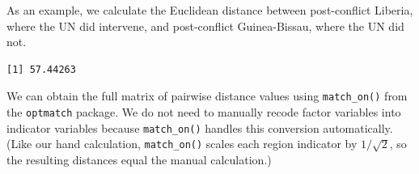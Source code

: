 \documentclass[
  12pt,
  leqno]{article}
\newenvironment{Shaded}{\begin{snugshade}}{\end{snugshade}}
\newcommand{\CommentTok}[1]{\textcolor[rgb]{0.56,0.35,0.01}{\textit{#1}}}
\newcommand{\DecValTok}[1]{\textcolor[rgb]{0.00,0.00,0.81}{#1}}
\newcommand{\FunctionTok}[1]{\textcolor[rgb]{0.13,0.29,0.53}{\textbf{#1}}}
\newcommand{\NormalTok}[1]{#1}
\newcommand{\OtherTok}[1]{\textcolor[rgb]{0.56,0.35,0.01}{#1}}
\newcommand{\SpecialCharTok}[1]{\textcolor[rgb]{0.81,0.36,0.00}{\textbf{#1}}}
\newcommand{\StringTok}[1]{\textcolor[rgb]{0.31,0.60,0.02}{#1}}
\begin{document}
\doublespacing

As an example, we calculate the Euclidean distance between post-conflict
Liberia, where the UN did intervene, and post-conflict Guinea-Bissau,
where the UN did not.

\singlespacing

\begin{Shaded}
\end{Shaded}

\begin{verbatim}
[1] 57.44263
\end{verbatim}

\doublespacing

We can obtain the full matrix of pairwise distance values using
\texttt{match\_on()} from the \texttt{optmatch} package. We do not need
to manually recode factor variables into indicator variables because
\texttt{match\_on()} handles this conversion automatically. (Like our
hand calculation, \texttt{match\_on()} scales each region indicator by
\(1/\sqrt{2}\), so the resulting distances equal the manual
calculation.)

\singlespacing
\end{document}
